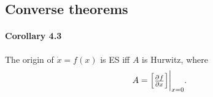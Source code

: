 \subsection{Converse theorems}
\paragraph{Corollary 4.3}
The origin of $\dot{x} = f(x)$ is ES iff $A$ is Hurwitz, where
\begin{equation}
	A =
	\begin{bmatrix}
		\pd{f}{x}
	\end{bmatrix}
	\evalat{x=0}
	.
\end{equation}
